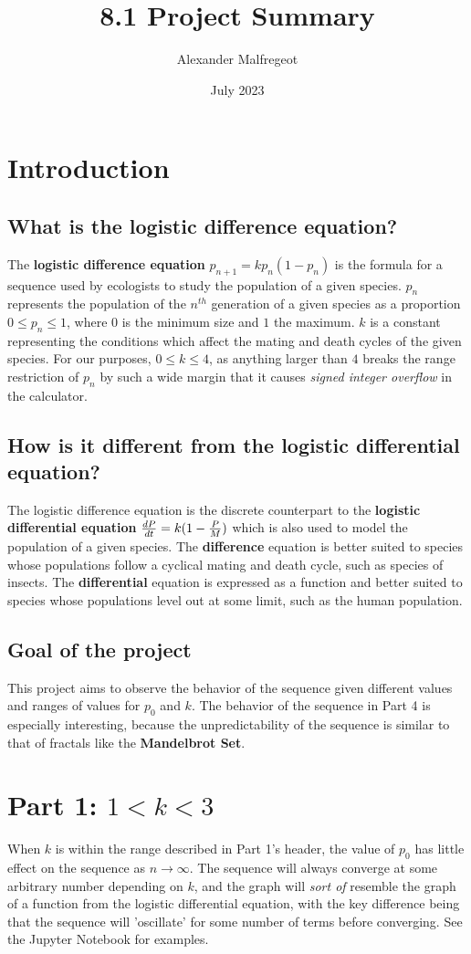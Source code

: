 \documentclass{article}
\title{8.1 Project Summary}
\author{Alexander Malfregeot}
\date{July 2023}
\begin{document}
\maketitle

\section*{Introduction}
\subsection*{What is the logistic difference equation?}
The \textbf{logistic difference equation} $p_{n+1}=kp_n(1-p_n)$ is the formula for a sequence used by ecologists to study the population of a given species. $p_n$ represents the population of the $n^{th}$ generation of a given species as a proportion $0 \leq p_n \leq 1$, where $0$ is the minimum size and $1$ the maximum. $k$ is a constant representing the conditions which affect the mating and death cycles of the given species. For our purposes, $0 \leq k \leq 4$, as anything larger than $4$ breaks the range restriction of $p_n$ by such a wide margin that it causes \textit{signed integer overflow} in the calculator.
\subsection*{How is it different from the logistic differential equation?}
The logistic difference equation is the discrete counterpart to the \textbf{logistic differential equation} ${dP\over dt}=k(1-{P\over M})$ which is also used to model the population of a given species. The \textbf{difference} equation is better suited to species whose populations follow a cyclical mating and death cycle, such as species of insects. The \textbf{differential} equation is expressed as a function and better suited to species whose populations level out at some limit, such as the human population.
\subsection*{Goal of the project}
This project aims to observe the behavior of the sequence given different values and ranges of values for $p_0$ and $k$. The behavior of the sequence in Part 4 is especially interesting, because the unpredictability of the sequence is similar to that of fractals like the \textbf{Mandelbrot Set}.
\section*{Part 1: $1 < k < 3$}
When $k$ is within the range described in Part 1's header, the value of $p_0$ has little effect on the sequence as $n \rightarrow \infty$. The sequence will always converge at some arbitrary number depending on $k$, and the graph will \textit{sort of} resemble the graph of a function from the logistic differential equation, with the key difference being that the sequence will 'oscillate' for some number of terms before converging. See the Jupyter Notebook for examples.
\end{document}
